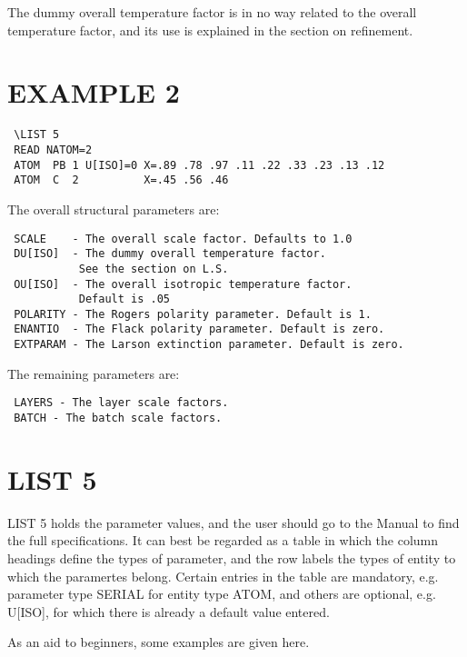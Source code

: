 \documentclass[10pt,a4paper]{report}
\begin{document}
The dummy overall temperature factor is in no way related to the overall
 temperature factor, and its use is explained in the section on refinement.




\section{EXAMPLE 2}
\small\begin{verbatim}
 \LIST 5
 READ NATOM=2
 ATOM  PB 1 U[ISO]=0 X=.89 .78 .97 .11 .22 .33 .23 .13 .12
 ATOM  C  2          X=.45 .56 .46
\end{verbatim}\normalsize




The overall structural parameters are:

\small\begin{verbatim}
 SCALE    - The overall scale factor. Defaults to 1.0
 DU[ISO]  - The dummy overall temperature factor. 
           See the section on L.S.
 OU[ISO]  - The overall isotropic temperature factor. 
           Default is .05
 POLARITY - The Rogers polarity parameter. Default is 1.
 ENANTIO  - The Flack polarity parameter. Default is zero.
 EXTPARAM - The Larson extinction parameter. Default is zero.
\end{verbatim}\normalsize




The remaining parameters are:

\small\begin{verbatim}
 LAYERS - The layer scale factors.
 BATCH - The batch scale factors.
\end{verbatim}\normalsize


\section{LIST 5}





LIST 5 holds the parameter values, and the user should go to the Manual
  to find the full specifications. It can best be regarded as a table
 in which the column headings define the types of parameter, and the row
 labels the types of entity to which the paramertes belong. Certain entries
 in the table are mandatory, e.g. parameter type SERIAL for entity type
 ATOM, and others are optional, e.g. U[ISO], for which there is already
 a default value entered.


 
 As an aid to beginners, some examples are given here.
\end{document}
